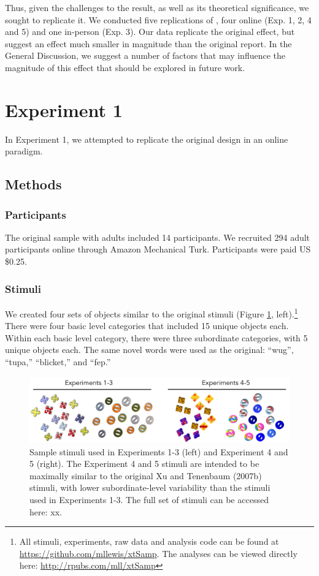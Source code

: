 \documentclass[man]{apa2}
\begin{document}

Thus, given the challenges to the  result, as well as its theoretical significance, we sought to replicate it. We conducted five replications of , four online (Exp. 1, 2,  4 and 5) and one in-person (Exp. 3). Our data replicate the original effect, but suggest an effect much smaller in magnitude than the original report. In the General Discussion, we suggest a number of factors that may influence the magnitude of this effect that should be explored in future work.
 
\section{Experiment 1} 
In Experiment 1, we attempted to replicate the original design in an online paradigm. 

\subsection{Methods}
\subsubsection{Participants} 
The original sample with adults included 14 participants. We recruited 294 adult participants online through Amazon Mechanical Turk. Participants were paid US \$0.25. 
\subsubsection{Stimuli}
We created four sets of objects similar to the original stimuli (Figure \ref{fig:stims}, left).\footnote{All stimuli, experiments, raw data and analysis code can be found at \url{https://github.com/mllewis/xtSamp}. The analyses can be viewed directly here: \url{http://rpubs.com/mll/xtSamp}} There were four basic level categories that included 15 unique objects each. Within each basic level category, there were three subordinate categories, with 5 unique objects each. The same novel words were used as the original: ``wug'', ``tupa,'' ``blicket,'' and ``fep.''
\begin{figure}[t]
 \begin{center} 
 \includegraphics[width=5in]{figures/stims.png} 
 \caption{ \label{fig:stims} Sample stimuli used in Experiments 1-3 (left) and Experiment 4 and 5 (right). The Experiment 4 and 5 stimuli are intended to be maximally similar to the original Xu and Tenenbaum (2007b) stimuli, with lower subordinate-level variability than the stimuli used in Experiments 1-3. The full set of stimuli can be accessed here: xx. } 
 \end{center} 
\end{figure}	
 
\end{document}
